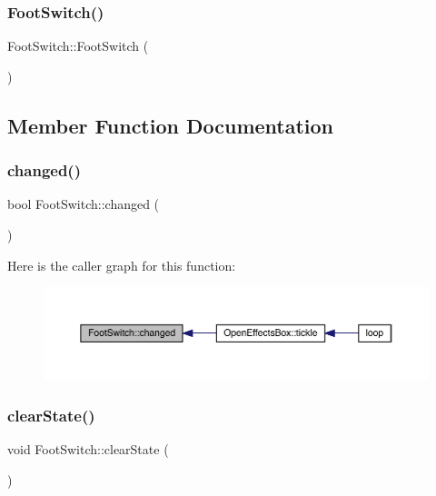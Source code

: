 \subsubsection{\texorpdfstring{Foot\+Switch()}{FootSwitch()}}
{\footnotesize\ttfamily Foot\+Switch\+::\+Foot\+Switch (\begin{DoxyParamCaption}{ }\end{DoxyParamCaption})}



\subsection{Member Function Documentation}
\mbox{\label{class_foot_switch_abc055774bd30c4b6185f323d4e58789e}} 
\subsubsection{\texorpdfstring{changed()}{changed()}}
{\footnotesize\ttfamily bool Foot\+Switch\+::changed (\begin{DoxyParamCaption}{ }\end{DoxyParamCaption})}

Here is the caller graph for this function\+:\nopagebreak
\begin{figure}[H]
\begin{center}
\leavevmode
\includegraphics[width=350pt]{class_foot_switch_abc055774bd30c4b6185f323d4e58789e_icgraph}
\end{center}
\end{figure}
\mbox{\label{class_foot_switch_a2971bbc4bbc9b14001c350d29f8f7ae9}} 
\subsubsection{\texorpdfstring{clear\+State()}{clearState()}}
{\footnotesize\ttfamily void Foot\+Switch\+::clear\+State (\begin{DoxyParamCaption}{ }\end{DoxyParamCaption})}

